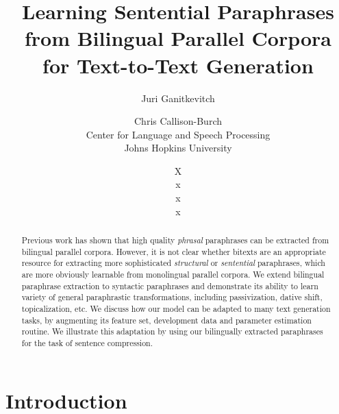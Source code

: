 \documentclass[11pt]{article}
\title{Learning Sentential Paraphrases from Bilingual Parallel Corpora \\ for Text-to-Text Generation}
\author{Juri Ganitkevitch \and Chris Callison-Burch\\ 
Center for Language and Speech Processing\\ 
Johns Hopkins University}
\author{X\\ 
x\\ 
x\\ 
x}
\date{}
\begin{document}
\maketitle

\begin{abstract}
Previous work has shown that high quality {\it phrasal} paraphrases can be extracted from  bilingual parallel corpora.  However, it is not clear whether bitexts are an appropriate resource for extracting more sophisticated {\it structural} or {\it sentential} paraphrases, which are more obviously learnable from monolingual parallel corpora.
We extend bilingual paraphrase extraction to syntactic paraphrases
and demonstrate its ability to learn variety of general paraphrastic transformations, 
including passivization, dative shift, topicalization, etc.  We discuss how our model can be adapted to many text generation tasks, by augmenting its feature set, development data and parameter estimation routine.  We illustrate this adaptation by using our bilingually extracted paraphrases for the task of sentence compression. 
\end{abstract}


\section{Introduction} \label{introduction}
\end{document}
